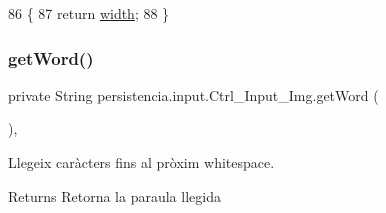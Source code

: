 \begin{DoxyCode}
86                           \{
87         \textcolor{keywordflow}{return} \hyperlink{classpersistencia_1_1input_1_1Ctrl__Input__Img_a51dd0b9243b854aa25ac4532acca4524}{width};
88     \}
\end{DoxyCode}
\mbox{\label{classpersistencia_1_1input_1_1Ctrl__Input__Img_a17676e8616da5821ca2323da4691d240}} 
\subsubsection{\texorpdfstring{get\+Word()}{getWord()}}
{\footnotesize\ttfamily private String persistencia.\+input.\+Ctrl\+\_\+\+Input\+\_\+\+Img.\+get\+Word (\begin{DoxyParamCaption}{ }\end{DoxyParamCaption})\hspace{0.3cm}{\ttfamily [inline]}, {\ttfamily [private]}}



Llegeix caràcters fins al pròxim whitespace. 

\begin{DoxyReturn}{Returns}
Retorna la paraula llegida 
\end{DoxyReturn}

